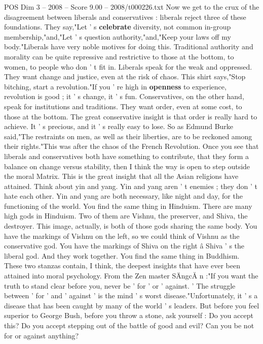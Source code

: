\begin{textsample}{POS Dim 3 – 2008 – Score 9.00 – 2008/t000226.txt}
Now we get to the crux of the disagreement between liberals and conservatives : liberals reject three of these foundations.
They say,"Let ' s \textbf{celebrate} diversity, not common in-group membership,"and,"Let ' s question authority,"and,"Keep your laws off my body."Liberals have very noble motives for doing this.
Traditional authority and morality can be quite repressive and restrictive to those at the bottom, to women, to people who don ' t fit in.
Liberals speak for the weak and oppressed.
They want change and justice, even at the risk of chaos.
This shirt says,"Stop bitching, start a revolution."If you ' re high in \textbf{openness} to experience, revolution is good ; it ' s change, it ' s fun.
Conservatives, on the other hand, speak for institutions and traditions.
They want order, even at some cost, to those at the bottom.
The great conservative insight is that order is really hard to achieve.
It ' s precious, and it ' s really easy to lose.
So as Edmund Burke said,"The restraints on men, as well as their liberties, are to be reckoned among their rights."This was after the chaos of the French Revolution.
Once you see that liberals and conservatives both have something to contribute, that they form a balance on change versus stability, then I think the way is open to step outside the moral Matrix.
This is the great insight that all the Asian religions have attained.
Think about yin and yang.
Yin and yang aren ' t enemies ; they don ' t hate each other.
Yin and yang are both necessary, like night and day, for the functioning of the world.
You find the same thing in Hinduism.
There are many high gods in Hinduism.
Two of them are Vishnu, the preserver, and Shiva, the destroyer.
This image, actually, is both of those gods sharing the same body.
You have the markings of Vishnu on the left, so we could think of Vishnu as the conservative god.
You have the markings of Shiva on the right â Shiva ' s the liberal god.
And they work together.
You find the same thing in Buddhism.
These two stanzas contain, I think, the deepest insights that have ever been attained into moral psychology.
From the Zen master SÄngcĂ n :"If you want the truth to stand clear before you, never be ' for ' or ' against. ' The struggle between ' for ' and ' against ' is the mind ' s worst disease."Unfortunately, it ' s a disease that has been caught by many of the world ' s leaders.
But before you feel superior to George Bush, before you throw a stone, ask yourself : Do you accept this?
Do you accept stepping out of the battle of good and evil?
Can you be not for or against anything?

\end{textsample}
